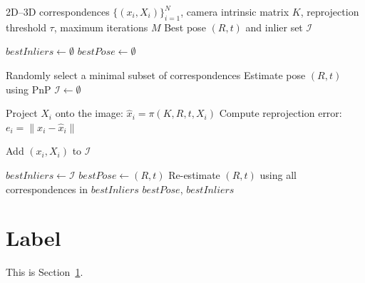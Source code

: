 \begin{algorithm}[H]
    \caption{Standard RANSAC-PnP Method Based on for Outlier Rejection}
    \label{algorithm:example}
    \begin{algorithmic}[1]
        \setlength{\itemsep}{1pt}       %
        \setlength{\parsep}{0pt}        %
        \linespread{0.9}\selectfont     %
        \Require 2D--3D correspondences $\{(x_i, X_i)\}_{i=1}^{N}$,
                 camera intrinsic matrix $K$,
                 reprojection threshold $\tau$,
                 maximum iterations $M$
        \Ensure Best pose $(R,t)$ and inlier set $\mathcal{I}$

        \State $bestInliers \gets \emptyset$
        \State $bestPose \gets \emptyset$

            \State Randomly select a minimal subset of correspondences
            \State Estimate pose $(R,t)$ using PnP
            \State $\mathcal{I} \gets \emptyset$

                \State Project $X_i$ onto the image: $\hat{x}_i = \pi(K,R,t,X_i)$
                \State Compute reprojection error: $e_i = \|x_i-\hat{x}_i\|$

                    \State Add $(x_i,X_i)$ to $\mathcal{I}$
                \EndIf
            \EndFor

                \State $bestInliers \gets \mathcal{I}$
                \State $bestPose \gets (R,t)$
            \EndIf
        \EndFor
        \State Re-estimate $(R,t)$ using all correspondences in $bestInliers$
        \State \Return $bestPose$, $bestInliers$
    \end{algorithmic}
\end{algorithm}

\section{Label} \label{subsec: labelName}
This is Section~\ref{subsec: labelName}.

